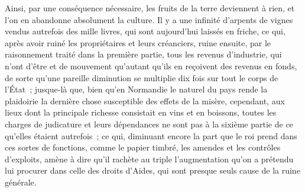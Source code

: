 \documentclass[french,twoside]{book} %
\begin{document}
Ainsi, par une conséquence nécessaire, les fruits de la terre deviennent à rien, et l’on en abandonne absolument la culture. Il y a une infinité d’arpents de vignes vendus autrefois des mille livres, qui sont aujourd’hui laissés en friche, ce qui, après avoir ruiné les propriétaires et leurs créanciers, ruine ensuite, par le raisonnement traité dans la première partie, tous les revenus d’industrie, qui n’ont d’être et de mouvement qu’autant qu’ils en reçoivent des revenus en fonds, de sorte qu’une pareille diminution se multiplie dix fois sur tout le corps de l’État ; jusque-là que, bien qu’en Normandie le naturel du pays rende la plaidoirie la dernière chose susceptible des effets de la misère, cependant, aux lieux dont la principale richesse consistait en vins et en boissons, toutes les charges de judicature et leurs dépendances ne sont pas à la sixième partie de ce qu’elles étaient autrefois ; ce qui, diminuant encore la part que le roi prend dans ces sortes de fonctions, comme le papier timbré, les amendes et les contrôles d’exploits, amène à dire qu’il rachète au triple l’augmentation qu’on a prétendu lui procurer dans celle des droits d’Aides, qui sont presque seuls cause de la ruine générale.
\end{document}

